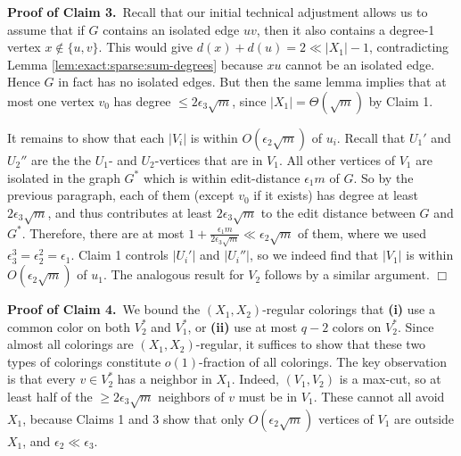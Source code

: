 \documentclass[11pt]{article}
\begin{document}
\vspace{3mm}


\noindent \textbf{Proof of Claim 3.}\, Recall that our initial
technical adjustment allows us to assume that if $G$ contains an
isolated edge $uv$, then it also contains a degree-1 vertex $x \not
\in \{u,v\}$.  This would give $d(x) + d(u) = 2 \ll |X_1| - 1$,
contradicting Lemma \ref{lem:exact:sparse:sum-degrees} because $xu$
cannot be an isolated edge.  Hence $G$ in fact has no isolated edges.
But then the same lemma implies that at most one vertex $v_0$ has
degree $\leq 2 \epsilon_3 \sqrt{m}$, since $|X_1| = \Theta(\sqrt{m})$
by Claim 1.

It remains to show that each $|V_i|$ is within $O(\epsilon_2
\sqrt{m})$ of $u_i$.  Recall that $U_1'$ and $U_2''$ are the the
$U_1$- and $U_2$-vertices that are in $V_1$.  All other vertices of
$V_1$ are isolated in the graph $G^*$ which is within edit-distance
$\epsilon_1 m$ of $G$.  So by the previous paragraph, each of them
(except $v_0$ if it exists) has degree at least $2 \epsilon_3
\sqrt{m}$, and thus contributes at least $2 \epsilon_3 \sqrt{m}$ to
the edit distance between $G$ and $G^*$.  Therefore, there are at most
$1 + \frac{\epsilon_1 m}{2 \epsilon_3 \sqrt{m}} \ll \epsilon_2
\sqrt{m}$ of them, where we used $\epsilon_3^3 = \epsilon_2^2 =
\epsilon_1$.  Claim 1 controls $|U_i'|$ and $|U_i''|$, so we indeed
find that $|V_1|$ is within $O(\epsilon_2 \sqrt{m})$ of $u_1$.  The
analogous result for $V_2$ follows by a similar argument.  \hfill
$\Box$



\vspace{3mm}




\noindent \textbf{Proof of Claim 4.}\, We bound the $(X_1,
X_2)$-regular colorings that \textbf{(i)} use a common color on both
$V_2^*$ and $V_1^*$, or \textbf{(ii)} use at most $q-2$ colors on
$V_2^*$.  Since almost all colorings are $(X_1, X_2)$-regular, it
suffices to show that these two types of colorings constitute
$o(1)$-fraction of all colorings.  The key observation is that every
$v \in V_2^*$ has a neighbor in $X_1$.  Indeed, $(V_1, V_2)$ is a
max-cut, so at least half of the $\geq 2 \epsilon_3 \sqrt{m}$
neighbors of $v$ must be in $V_1$.  These cannot all avoid $X_1$,
because Claims 1 and 3 show that only $O(\epsilon_2 \sqrt{m})$
vertices of $V_1$ are outside $X_1$, and $\epsilon_2 \ll \epsilon_3$.
\end{document}
